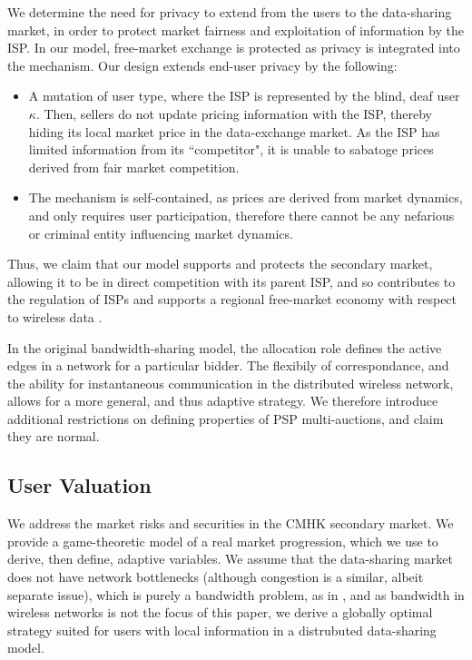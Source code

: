 \documentclass[sigconf, anonymous]{acmart}
\theoremstyle{definition}
\begin{document}
We determine the need for privacy to extend from the users to the data-sharing market, in
order to protect market fairness and exploitation of information by the ISP. In
our model, free-market exchange is protected as privacy is integrated into the
mechanism. Our design extends end-user privacy by the following: 
\begin{itemize}
    \item A mutation of user type, where
    the ISP is represented by the blind, deaf user $\kappa$. Then, 
    sellers do not update pricing information with the ISP, thereby hiding
    its local market price in the data-exchange market. As the ISP has limited
    information from its ``competitor", it is unable to sabatoge prices derived
    from fair market competition.
    \item The mechanism is self-contained, as prices are derived from market
    dynamics, and only requires user participation,
    therefore there cannot be any nefarious or criminal entity influencing
    market dynamics.
\end{itemize}
Thus, we claim that our model supports and protects the secondary market, allowing it
to be in direct competition with its parent ISP, and so contributes to the
regulation of ISPs \cite{fedbill} and supports a regional free-market economy
with respect to wireless data \cite{cabill}.

In the original bandwidth-sharing model, the allocation role defines the active edges in a network for a particular bidder. 
The flexibily of correspondance, and
the ability for instantaneous communication in the distributed wireless network, allows for a more general, and
thus adaptive strategy. We therefore introduce additional restrictions on
defining properties of PSP multi-auctions, and claim they are normal.

\subsection{User Valuation}

We address the market risks and securities in the CMHK secondary market. 
We provide a game-theoretic model of a real market progression, which we use to
derive, then define, adaptive variables. 
We assume that the data-sharing market does not have network
bottlenecks (although congestion is a similar, albeit separate issue), which is purely a bandwidth problem, as in \cite{semret}, and as
bandwidth in wireless networks is not the focus of this paper, we derive a globally optimal strategy suited for
users with local information in a distrubuted data-sharing model. 
\end{document}
